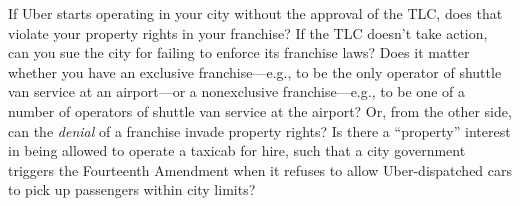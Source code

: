 \item If Uber starts operating in your city without the approval of the TLC,
does that violate your property rights in your franchise? If the TLC doesn't
take action, can you sue the city for failing to enforce its franchise laws?
Does it matter whether you have an exclusive franchise---e.g., to be the only
operator of shuttle van service at an airport---or a nonexclusive
franchise---e.g., to be one of a number of operators of shuttle van service at
the airport?
Or, from the other side, can the \textit{denial} of a franchise invade property
rights? Is there a ``property'' interest in being allowed to operate a taxicab
for hire, such that a city government triggers the Fourteenth Amendment when it
refuses to allow Uber-dispatched cars to pick up passengers within city limits?
